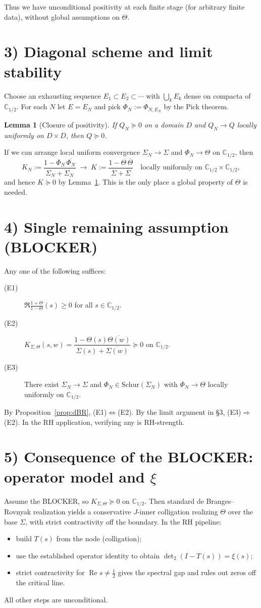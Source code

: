 \documentclass[11pt]{article}
\newcommand{\C}{\mathbb{C}}
\newcommand{\ReS}{\operatorname{Re}}
\newcommand{\Si}{\Sigma}
\newcommand{\SiN}{\Sigma_N}
\newcommand{\Th}{\Theta}
\newcommand{\detTwo}{\det\nolimits_{2}}
\theoremstyle{plain}
\newtheorem{lemma}[theorem]{Lemma}
\theoremstyle{definition}
\theoremstyle{remark}
\begin{document}
Thus we have unconditional positivity at each finite stage (for arbitrary finite data), without global assumptions on $\Th$.

\section*{3) Diagonal scheme and limit stability}
Choose an exhausting sequence $E_1\subset E_2\subset\cdots$ with $\bigcup_k E_k$ dense on compacta of $\C_{1/2}$. For each $N$ let $E=E_N$ and pick $\Phi_N:=\Phi_{N,E_N}$ by the Pick theorem.

\begin{lemma}[Closure of positivity]\label{lem:closure}
If $Q_N\succeq 0$ on a domain $D$ and $Q_N\to Q$ locally uniformly on $D\times D$, then $Q\succeq 0$.
\end{lemma}

If we can arrange local uniform convergence $\SiN\to\Si$ and $\Phi_N\to\Th$ on $\C_{1/2}$, then
\[
K_N:=\frac{1-\Phi_N\,\overline{\Phi_N}}{\SiN+\overline{\SiN}}\;\longrightarrow\; K:=\frac{1-\Th\,\overline{\Th}}{\Si+\overline{\Si}}\quad\text{locally uniformly on }\C_{1/2}\times\C_{1/2},
\]
and hence $K\succeq0$ by Lemma~\ref{lem:closure}. This is the only place a global property of $\Th$ is needed.

\section*{4) Single remaining assumption (BLOCKER)}
Any one of the following suffices:
\begin{description}
  \item[(E1)] $\displaystyle \Re\frac{1+\Th}{1-\Th}(s)\ge 0$ for all $s\in\C_{1/2}$.
  \item[(E2)] $K_{\Si,\Th}(s,w)=\dfrac{1-\Th(s)\overline{\Th(w)}}{\Si(s)+\overline{\Si(w)}}\succeq0$ on $\C_{1/2}$.
  \item[(E3)] There exist $\SiN\to\Si$ and $\Phi_N\in\mathrm{Schur}(\SiN)$ with $\Phi_N\to\Th$ locally uniformly on $\C_{1/2}$.
\end{description}
By Proposition~\ref{prop:dBR}, (E1)$\iff$(E2). By the limit argument in \S3, (E3)$\Rightarrow$(E2). In the RH application, verifying any is RH-strength.

\section*{5) Consequence of the BLOCKER: operator model and $\xi$}
Assume the BLOCKER, so $K_{\Si,\Th}\succeq0$ on $\C_{1/2}$. Then standard de Branges--Rovnyak realization yields a conservative $J$-inner colligation realizing $\Th$ over the base $\Si$, with strict contractivity off the boundary. In the RH pipeline:
\begin{itemize}
  \item build $T(s)$ from the node (colligation);
  \item use the established operator identity to obtain $\detTwo(I-T(s))=\xi(s)$;
  \item strict contractivity for $\ReS s\ne\tfrac12$ gives the spectral gap and rules out zeros off the critical line.
\end{itemize}
All other steps are unconditional.
\end{document}
